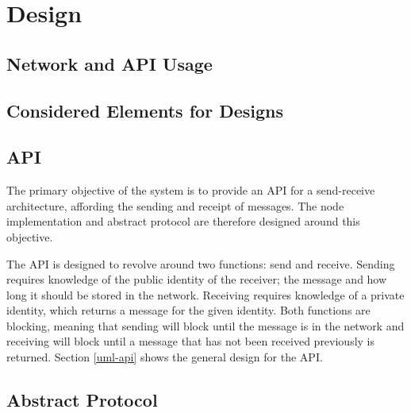 \section{Design} \label{design}

	\subsection{Network and API Usage}
		
	\subsection{Considered Elements for Designs}
		
		
	\subsection{API} %
		The primary objective of the system is to provide an API for a send-receive architecture, affording the sending and receipt of messages. The node implementation and abstract protocol are therefore designed around this objective.
		
		The API is designed to revolve around two functions: send and receive. Sending requires knowledge of the public identity of the receiver; the message and how long it should be stored in the network. Receiving requires knowledge of a private identity, which returns a message for the given identity. Both functions are blocking, meaning that sending will block until the message is in the network and receiving will block until a message that has not been received previously is returned. Section \ref{uml-api} shows the general design for the API.
	\subsection{Abstract Protocol} %
			
			